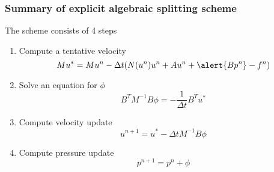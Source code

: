 \begin{frame}
\frametitle{Summary of explicit algebraic splitting scheme}
The scheme consists of 4 steps
\begin{enumerate}
\item  Compute a tentative velocity 
\[
M u^{*} = M u^n - \Delta t ( N(u^n) u^n  +  A u^n +  \alert{B p^n} - f^n)  
\]
\item  Solve an equation for $\phi$ 
\[
B^T M^{-1} B \phi = - \frac{1}{\Delta t} B^T u^* 
\]
\item  Compute velocity update 
\[
u^{n+1} = u^* - \Delta t M^{-1} B \phi 
\]
\item  Compute pressure update 
\[
p^{n+1} = p^n + \phi 
\]
\end{enumerate}
\end{frame}


